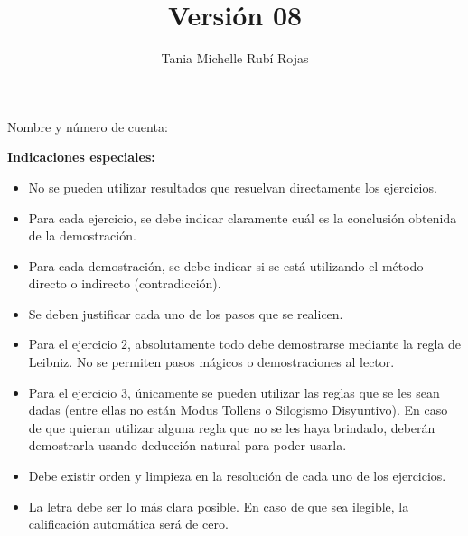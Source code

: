 \documentclass[oneside]{style}
\title{Versión 08}
\author{Tania Michelle Rubí Rojas}
\begin{document}
\maketitle

\vspace{2.5mm}
\noindent
Nombre y número de cuenta: \hrulefill\

\vspace{5mm}
\noindent
\textbf{Indicaciones especiales:}
{\small
\begin{multicols}{2}
\begin{itemize}
  \item No se pueden utilizar resultados que resuelvan directamente los 
  ejercicios. 

  \item Para cada ejercicio, se debe indicar claramente cuál es la conclusión 
  obtenida de la demostración. 

  \item Para cada demostración, se debe indicar si se está utilizando 
  el método directo o indirecto (contradicción).  

  \item Se deben justificar cada uno de los pasos que se realicen. 
  
  \item Para el ejercicio $2$, absolutamente todo debe demostrarse mediante la 
  regla de Leibniz. No se permiten pasos mágicos o demostraciones al lector. 

  \item Para el ejercicio $3$, únicamente se pueden utilizar las reglas que 
  se les sean dadas (entre ellas no están Modus Tollens o Silogismo 
  Disyuntivo). En caso de que quieran utilizar alguna regla que no se les haya 
  brindado, deberán demostrarla usando deducción natural para poder usarla. 
  
  \item Debe existir orden y limpieza en la resolución de cada uno de los 
  ejercicios. 

  \item La letra debe ser lo más clara posible. En caso de que sea ilegible, 
  la calificación automática será de cero. 
\end{itemize}
\end{multicols}
}
\end{document}
